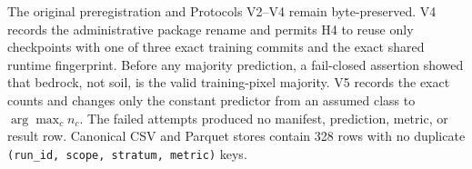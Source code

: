 \documentclass{article}
\newcommand{\code}[1]{\texttt{#1}}
\begin{document}
The original preregistration and Protocols V2--V4 remain byte-preserved. V4 records the
administrative package rename and permits H4 to reuse only checkpoints with one of three exact
training commits and the exact shared runtime fingerprint. Before any majority prediction, a
fail-closed assertion showed that bedrock, not soil, is the valid training-pixel majority. V5
records the exact counts and changes only the constant predictor from an assumed class to
$\arg\max_c n_c$. The failed attempts produced no manifest, prediction, metric, or result row.
Canonical CSV and Parquet stores contain 328 rows with no duplicate
\code{(run\_id, scope, stratum, metric)} keys.


\end{document}
